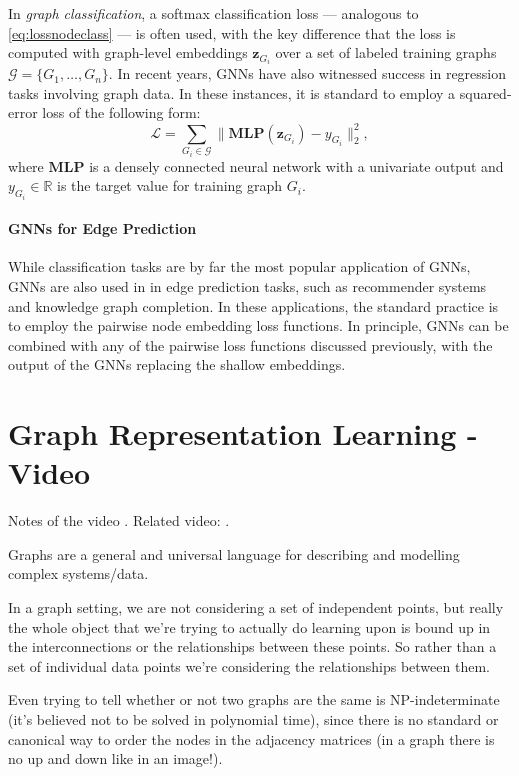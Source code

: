 \documentclass[10pt]{book}
\let\defaultmarginpar\marginpar
\renewcommand\marginpar[2][]{\defaultmarginpar{\itshape\color{gray}#2}}
\begin{document}
In \emph{graph classification}\marginpar{graph classification}, a softmax classification loss --- analogous to \autoref{eq:lossnodeclass} --- is often used, with the key difference that the loss is computed with graph-level embeddings $\mathbf z_{G_i}$ over a set of labeled training graphs $\mathcal G = \{G_1, \ldots, G_n\}$. In recent years, GNNs have also witnessed success in regression tasks involving graph data. In these instances, it is standard to employ a squared-error loss of the following form:
\begin{equation}
    \mathcal L = \sum_{G_i \in \mathcal G} \| \textbf{MLP}(\mathbf z_{G_i}) - y_{G_i}\|_2^2,
\end{equation}
where $\textbf{MLP}$ is a densely connected neural network with a univariate output and $y_{G_i} \in \mathbb R$ is the target value for training graph $G_i$.

\subsubsection{GNNs for Edge Prediction}

While classification tasks are by far the most popular application of GNNs, GNNs are also used in in edge prediction tasks, such as recommender systems and knowledge graph completion. In these applications, the standard practice is to employ the pairwise node embedding loss functions. In principle, GNNs can be combined with any of the pairwise loss functions discussed previously, with the output of the GNNs replacing the shallow embeddings.




\chapter{Graph Representation Learning - Video}

Notes of the video \cite{HamiltonGRLVideo}. Related video: \cite{PetarTF-GNN}.

Graphs are a general and universal language for describing and modelling complex systems/data.

In a graph setting, we are not considering a set of independent points, but really the whole object that we're trying to actually do learning upon is bound up in the interconnections or the relationships between these points. So rather than a set of individual data points we're considering the relationships between them.

Even trying to tell whether or not two graphs are the same is NP-indeterminate (it's believed not to be solved in polynomial time), since there is no standard or canonical way to order the nodes in the adjacency matrices (in a graph there is no up and down like in an image!).
\end{document}
